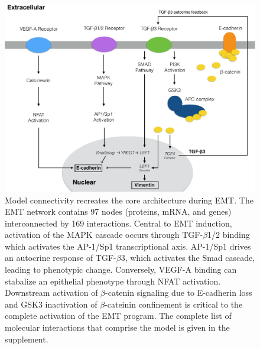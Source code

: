 \documentclass[12pt]{article}
\begin{document}
\begin{figure}
\includegraphics [width=1.0\linewidth] {./figs/Fig1_coarse_network.pdf}
\caption{Model connectivity recreates the core architecture during EMT. The EMT network contains 97 nodes (proteins, mRNA, and genes) interconnected by 169 interactions.
Central to EMT induction, activation of the MAPK cascade occurs through TGF-$\beta$1/2 binding which activates the AP-1/Sp1 transcriptional axis. AP-1/Sp1 drives an autocrine response of TGF-$\beta$3, which activates the Smad cascade, leading to phenotypic change. Conversely, VEGF-A binding can stabalize an epithelial phenotype through NFAT activation.
Downstream activation of $\beta$-catenin signaling due to E-cadherin loss and GSK3 inactivation of $\beta$-cateinin confinement is critical to the complete activation of the EMT program.
The complete list of molecular interactions that comprise the model is given in the supplement.}\label{fg:F1}
\end{figure}

\clearpage
\end{document}
